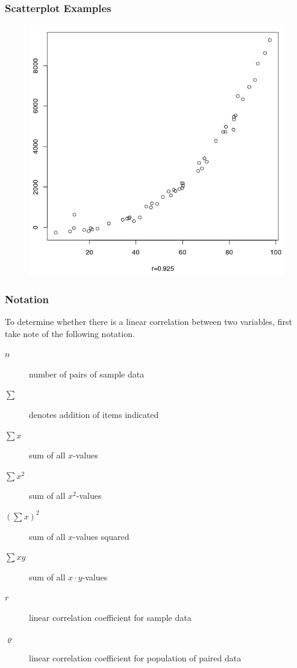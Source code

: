 \documentclass[xcolor=dvipsnames]{beamer}
\begin{document}
\begin{frame}
  \frametitle{Scatterplot Examples}
  \begin{figure}[h]
    \includegraphics[scale=0.35]{./diagrams/sc04.png}
  \end{figure}
\end{frame}

\begin{frame}
  \frametitle{Notation}
  To determine whether there is a linear correlation between two
  variables, first take note of the following notation.
  \begin{description}
  \item[$n$] number of pairs of sample data
  \item[$\sum$] denotes addition of items indicated
  \item[$\sum{}x$] sum of all $x$-values
  \item[$\sum{}x^{2}$] sum of all $x^{2}$-values
  \item[$(\sum{}x)^{2}$] sum of all $x$-values squared
  \item[$\sum{}xy$] sum of all $x\cdot{}y$-values
  \item[$r$] linear correlation coefficient for sample data
  \item[$\varrho$] linear correlation coefficient for population of paired data
  \end{description}
\end{frame}
\end{document}
